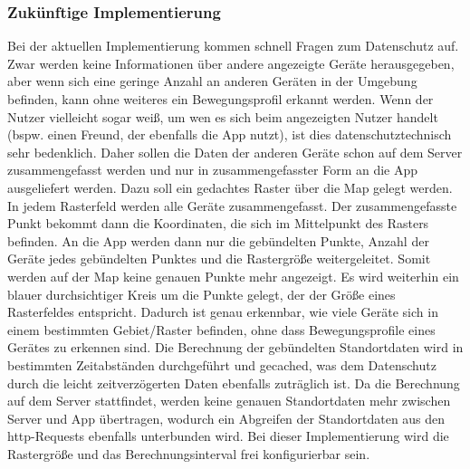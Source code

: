 \subsubsection{Zukünftige Implementierung}\label{subsubsec:mapFutureImpl}
Bei der aktuellen Implementierung kommen schnell Fragen zum Datenschutz auf. Zwar werden keine Informationen über andere angezeigte Geräte herausgegeben, aber wenn sich eine geringe Anzahl an anderen Geräten in der Umgebung befinden, kann ohne weiteres ein Bewegungsprofil erkannt werden. Wenn der Nutzer vielleicht sogar weiß, um wen es sich beim angezeigten Nutzer handelt (bspw. einen Freund, der ebenfalls die App nutzt), ist dies datenschutztechnisch sehr bedenklich. Daher sollen die Daten der anderen Geräte schon auf dem Server zusammengefasst werden und nur in zusammengefasster Form an die App ausgeliefert werden. Dazu soll ein gedachtes Raster über die Map gelegt werden. In jedem Rasterfeld werden alle Geräte zusammengefasst. Der zusammengefasste Punkt bekommt dann die Koordinaten, die sich im Mittelpunkt des Rasters befinden. An die App werden dann nur die gebündelten Punkte, Anzahl der Geräte jedes gebündelten Punktes und die Rastergröße weitergeleitet. Somit werden auf der Map keine genauen Punkte mehr angezeigt. Es wird weiterhin ein blauer durchsichtiger Kreis um die Punkte gelegt, der der Größe eines Rasterfeldes entspricht. Dadurch ist genau erkennbar, wie viele Geräte sich in einem bestimmten Gebiet/Raster befinden, ohne dass Bewegungsprofile eines Gerätes zu erkennen sind. Die Berechnung der gebündelten Standortdaten wird in bestimmten Zeitabständen durchgeführt und gecached, was dem Datenschutz durch die leicht zeitverzögerten Daten ebenfalls zuträglich ist. Da die Berechnung auf dem Server stattfindet, werden keine genauen Standortdaten mehr zwischen Server und App übertragen, wodurch ein Abgreifen der Standortdaten aus den http-Requests ebenfalls unterbunden wird. Bei dieser Implementierung wird die Rastergröße und das Berechnungsinterval frei konfigurierbar sein.
